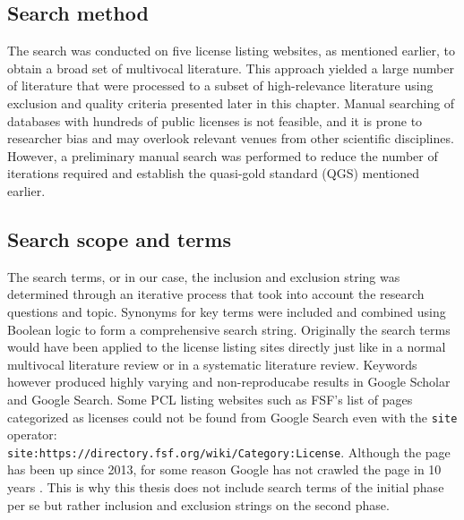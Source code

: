 \subsection{Search method}
The search was conducted on five license listing websites, as mentioned earlier, to obtain a broad set of multivocal literature. This approach yielded a large number of literature that were processed to a subset of high-relevance literature using exclusion and quality criteria presented later in this chapter. Manual searching of databases with hundreds of public licenses is not feasible, and it is prone to researcher bias and may overlook relevant venues from other scientific disciplines. However, a preliminary manual search was performed to reduce the number of iterations required and establish the quasi-gold standard (QGS) mentioned earlier.

\subsection{Search scope and terms}
The search terms, or in our case, the inclusion and exclusion string was determined through an iterative process that took into account the research questions and topic. Synonyms for key terms were included and combined using Boolean logic to form a comprehensive search string. Originally the search terms would have been applied to the license listing sites directly just like in a normal multivocal literature review or in a systematic literature review. Keywords however produced highly varying and non-reproducabe results in Google Scholar and Google Search. Some PCL listing websites such as FSF's list of pages categorized as licenses could not be found from Google Search even with the \texttt{site} operator: \\
\texttt{site:https://directory.fsf.org/wiki/Category:License}. Although the page has been up since 2013, for some reason Google has not crawled the page in 10 years \citep{fsf:licenselist}. This is why this thesis does not include search terms of the initial phase per se but rather inclusion and exclusion strings on the second phase.

